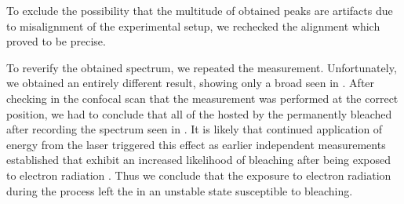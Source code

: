 				To exclude the possibility that the multitude of obtained peaks are artifacts due to misalignment of the experimental setup, we rechecked the alignment which proved to be precise.
				
				To reverify the obtained spectrum, we repeated the measurement. Unfortunately, we obtained an entirely different result, showing only a broad \bkg seen in . After checking in the confocal scan that the measurement was performed at the correct position, we had to conclude that all of the \sivs hosted by the \nd permanently bleached after recording the spectrum seen in . It is likely that continued application of energy from the laser triggered this effect as earlier independent measurements established that \sivs exhibit an increased likelihood of bleaching after being exposed to electron radiation \cite{MeyerBaccThesis}. Thus we conclude that the exposure to electron radiation during the \pp process left the \sivs in an unstable state susceptible to bleaching.

